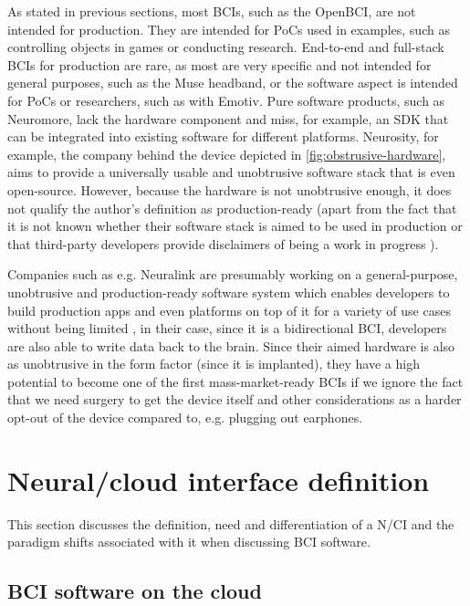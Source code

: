 As stated in previous sections, most BCIs, such as the OpenBCI, are not intended for production. They are intended for PoCs used in examples, such as controlling objects in games or conducting research. End-to-end and full-stack BCIs for production are rare, as most are very specific and not intended for general purposes, such as the Muse headband, or the software aspect is intended for PoCs or researchers, such as with Emotiv. Pure software products, such as Neuromore, lack the hardware component and miss, for example, an SDK that can be integrated into existing software for different platforms. Neurosity, for example, the company behind the device depicted in \autoref{fig:obstrusive-hardware}, aims to provide a universally usable and unobtrusive software stack that is even open-source. However, because the hardware is not unobtrusive enough, it does not qualify the author's definition as production-ready (apart from the fact that it is not known whether their software stack is aimed to be used in production \citep{neurosity_neurosity_2022} or that third-party developers provide disclaimers of being a work in progress \citep{turney_notion_2022}).

\newpage

Companies such as e.g. Neuralink are presumably working on a general-purpose, unobtrusive and production-ready software system which enables developers to build production apps and even platforms on top of it for a variety of use cases without being limited \citep{musk_integrated_2019}, in their case, since it is a bidirectional BCI, developers are also able to write data back to the brain. Since their aimed hardware is also as unobtrusive in the form factor (since it is implanted), they have a high potential to become one of the first mass-market-ready BCIs if we ignore the fact that we need surgery to get the device itself \citep{neuralink_approach_nodate} and other considerations as a harder opt-out of the device compared to, e.g. plugging out earphones.

\section{Neural/cloud interface definition}
\label{chapter2-neural-cloud-interface-definition}

This section discusses the definition, need and differentiation of a N/CI and the paradigm shifts associated with it when discussing BCI software.

\subsection{BCI software on the cloud}
\label{chapter2-bci-software-on-the-cloud}

